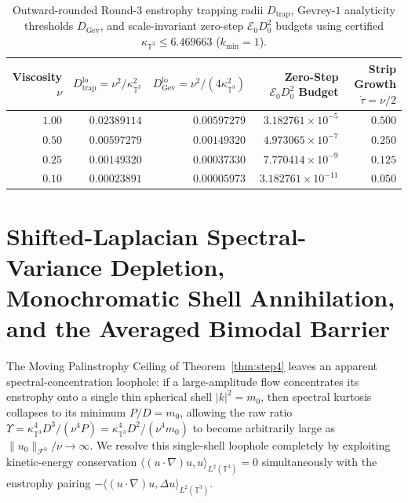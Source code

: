 \documentclass[11pt]{article}
\theoremstyle{plain}
\theoremstyle{definition}
\begin{document}
\begin{table}[htbp]
\centering
\caption{Outward-rounded Round-3 enstrophy trapping radii $D_{\mathrm{trap}}$, Gevrey-$1$ analyticity thresholds $D_{\mathrm{Gev}}$, and scale-invariant zero-step $\mathcal{E}_0 D_0^2$ budgets using certified $\kappa_{\mathbb{T}^3} \le 6.469663$ ($k_{\min} = 1$).}\label{tab:step4}
\vspace{4pt}
\begin{tabular}{@{}rrrrr@{}}
\toprule
Viscosity $\nu$ & $D_{\mathrm{trap}}^{\mathrm{lo}} = \nu^2 / \kappa_{\mathbb{T}^3}^2$ & $D_{\mathrm{Gev}}^{\mathrm{lo}} = \nu^2 / (4\kappa_{\mathbb{T}^3}^2)$ & Zero-Step $\mathcal{E}_0 D_0^2$ Budget & Strip Growth $\dot{\tau} = \nu/2$ \\
\midrule
$1.00$ & $0.02389114$ & $0.00597279$ & $3.182761 \times 10^{-5}$  & $0.500$ \\
$0.50$ & $0.00597279$ & $0.00149320$ & $4.973065 \times 10^{-7}$  & $0.250$ \\
$0.25$ & $0.00149320$ & $0.00037330$ & $7.770414 \times 10^{-9}$  & $0.125$ \\
$0.10$ & $0.00023891$ & $0.00005973$ & $3.182761 \times 10^{-11}$ & $0.050$ \\
\bottomrule
\end{tabular}
\end{table}

\section{Shifted-Laplacian Spectral-Variance Depletion, Monochromatic Shell Annihilation, and the Averaged Bimodal Barrier}\label{sec:step5}

The Moving Palinstrophy Ceiling of Theorem~\ref{thm:step4} leaves an apparent spectral-concentration loophole: if a large-amplitude flow concentrates its enstrophy onto a single thin spherical shell $|k|^2 = m_0$, then spectral kurtosis collapses to its minimum $P/D = m_0$, allowing the raw ratio $\Upsilon = \kappa_{\mathbb{T}^3}^4 D^3 / (\nu^4 P) = \kappa_{\mathbb{T}^3}^4 D^2 / (\nu^4 m_0)$ to become arbitrarily large as $\|u_0\|_{\mathcal{F}^0}/\nu \to \infty$. We resolve this single-shell loophole completely by exploiting kinetic-energy conservation $\langle (u\cdot\nabla)u, u\rangle_{L^2(\mathbb{T}^3)} = 0$ simultaneously with the enstrophy pairing $-\langle (u\cdot\nabla)u, \Delta u\rangle_{L^2(\mathbb{T}^3)}$.
\end{document}
